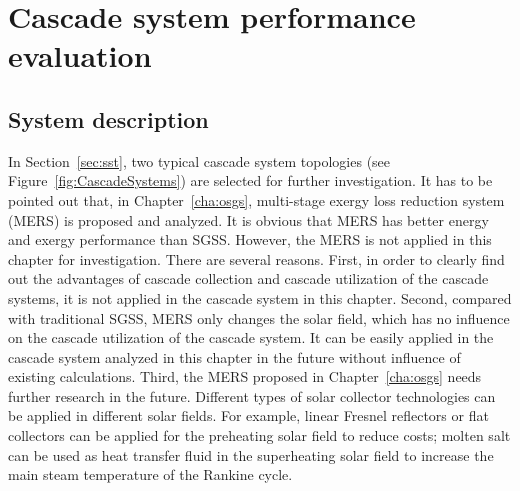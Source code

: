 \chapter{Cascade system performance evaluation}
\section{System description}

In Section~\ref{sec:sst}, two typical cascade system topologies (see Figure~\ref{fig:CascadeSystems}) are selected for further investigation. It has to be pointed out that, in Chapter~\ref{cha:osgs}, multi-stage exergy loss reduction system (MERS) is proposed and analyzed. It is obvious that MERS has better energy and exergy performance than SGSS. However, the MERS is not applied in this chapter for investigation. There are several reasons. First,
in order to clearly find out the advantages of cascade collection and cascade utilization of the cascade systems, it is not applied in the cascade system in this chapter. Second, compared with traditional SGSS, MERS only changes the solar field, which has no influence on the cascade utilization of the cascade system. It can be easily applied in the cascade system analyzed in this chapter in the future without influence of existing calculations. Third, the MERS proposed in Chapter~\ref{cha:osgs} needs further research in the future. Different types of solar collector technologies can be applied in different solar fields. For example, linear Fresnel reflectors or flat collectors can be applied for the preheating solar field to reduce costs; molten salt can be used as heat transfer fluid in the superheating solar field to increase the main steam temperature of the Rankine cycle.


